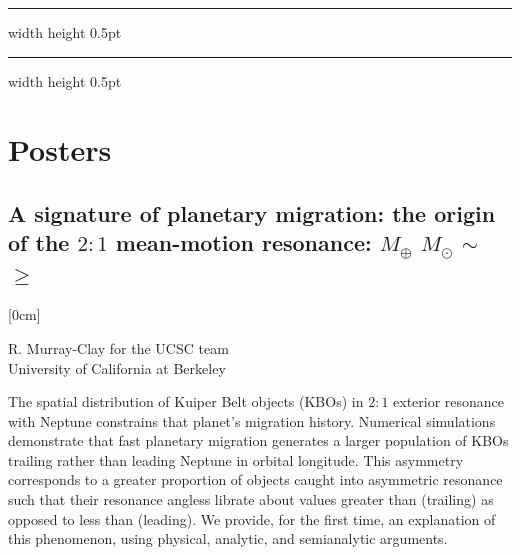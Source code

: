 \documentclass[a4paper,11pt]{book}
\def\doubleline{
\hrule width \hsize height 0.5pt  \kern 1mm \hrule width \hsize height 0.5pt 
}
\begin{document}
\noindent\doubleline
        



\chapter*{Posters}
        
          \section[A signature of planetary migration: the origin of the $2:1$ mean-motion resonance: $M_\oplus$ $M_\odot$ $\sim$ $\geq$ \newline(R. Murray-Clay)] { A signature of planetary migration: the origin of the $2:1$ mean-motion resonance: $M_\oplus$ $M_\odot$ $\sim$ $\geq$ }



[0cm]



\begin{center}
    
{\large R. Murray-Clay for the UCSC team}\\
  
\vspace{2 mm}
\noindent University of California at Berkeley\\

\end{center}



  
\vspace{2 mm}
\noindent The spatial distribution of Kuiper Belt objects (KBOs) in $2:1$ exterior resonance with Neptune constrains that planet’s migration history. Numerical simulations demonstrate that fast planetary migration generates a larger population of KBOs trailing rather than leading Neptune in orbital longitude. This asymmetry corresponds to a greater proportion of objects caught into asymmetric resonance such that their resonance angless librate about values greater than (trailing) as opposed to less than (leading). We provide, for the first time, an explanation of this phenomenon, using physical, analytic, and semianalytic arguments.
\end{document}
